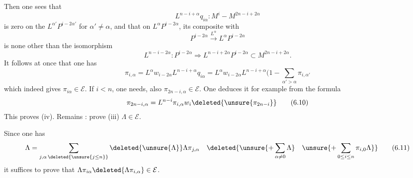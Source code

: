 Then one sees that
\[
L^{n-i+\alpha}q_{i\alpha}:M^i-M^{2n-i+2\alpha}
\]
is zero on the $L^{\alpha'}P^{i-2\alpha'}$ for $\alpha'\neq\alpha$, and that on $L^\alpha P^{i-2\alpha}$,  its composite with
\[
P^{i-2\alpha}\xrightarrow{L^\alpha}L^\alpha P^{i-2\alpha}
\]
is none other than the isomorphism
\[
L^{n-i-2\alpha}:P^{i-2\alpha}\Rightarrow L^{n-i+2\alpha}P^{i-2\alpha}\subset M^{2n-i+2\alpha}.
\]
It follows at once that one has
\[
\pi_{i,\alpha}=L^\alpha w_{i-2\alpha}L^{n-i+\alpha}q_{i\alpha}=L^\alpha w_{i-2\alpha}L^{n-i+\alpha}(1-\sum_{\alpha'>\alpha}\pi_{i,\alpha'}
\tag{6.9}
\]
which indeed gives $\pi_{i\alpha}\in\mathcal E$. 
If $i<n$, one needs, also $\pi_{2n-i,\alpha}\in\mathcal E$. One
deduces it for example from the formula
\[
\pi_{2n-i,\alpha}=L^{n-i}\pi_{i,\alpha}w_i\deleted{\unsure{\pi_{2n-i}}}
\tag{6.10}
\]
This proves  (iv). Remains : prove (iii) $\Lambda\in\mathcal E$.

Since one has
\[
\Lambda=\sum_{j,\alpha\,\deleted{\unsure{j\leq n}}}\deleted{\unsure{\Lambda}}\Lambda\pi_{j,\alpha}\quad\deleted{\unsure{+\sum_{\alpha\neq0}\Lambda}\quad\unsure{+\sum_{0\leq i\leq n}\pi_{i,0}\Lambda}}
\tag{6.11}
\]
it suffices to prove that $\Lambda\pi_{i\alpha}\deleted{\Lambda\pi_{i,\alpha}}\in\mathcal E$.
